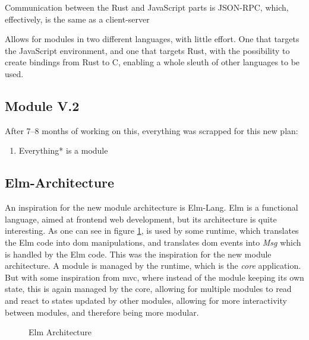Communication between the Rust and JavaScript parts is JSON-RPC, which,
effectively, is the same as a client-server

Allows for modules in two different languages, with little effort. One that
targets the JavaScript environment, and one that targets Rust, with the
possibility to create bindings from Rust to C, enabling a whole sleuth of other
languages to be used.


\subsection{Module V.2}


After 7–8 months of working on this, everything was scrapped for this new plan:

\begin{enumerate}
  \item Everything* is a module
\end{enumerate}

\subsection{Elm-Architecture}

An inspiration for the new module architecture is Elm-Lang. Elm is a functional
language, aimed at frontend web development, but its architecture is quite
interesting. As one can see in figure \ref{fig:elmArchitecture}, is used by some
runtime, which translates the Elm code into \gls{dom} manipulations, and translates
\gls{dom} events into \textit{Msg} which is handled by the Elm code. This was the
inspiration for the new module architecture. A module is managed by the runtime,
which is the \textit{core} application. But with some inspiration from
\gls{mvc}, where instead of the module keeping its own state, this is again
managed by the core, allowing for multiple modules to read and react to states
updated by other modules, allowing for more interactivity between modules, and
therefore being more modular.

\begin{figure}
  \centering
  
  \caption{Elm Architecture}
  \label{fig:elmArchitecture}
\end{figure}

